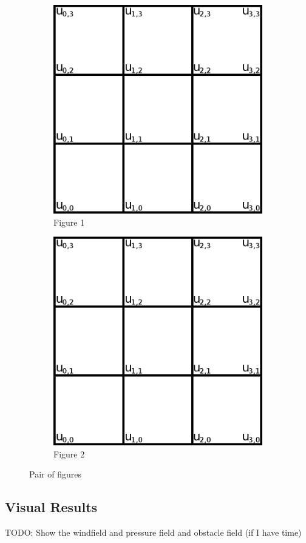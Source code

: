 \begin{figure}[ht]
	\center
	
	\begin{subfigure}{0.45\textwidth}
		\center
		\includegraphics[width=1.0\textwidth]{images/2d_poisson_ex}
		\caption{Figure 1}
		\label{fig:1}
	\end{subfigure}
	\begin{subfigure}{0.45\textwidth}
		\center
		\includegraphics[width=1.0\textwidth]{images/2d_poisson_ex}
		\caption{Figure 2}
		\label{fig:2}
	\end{subfigure}
	\caption{Pair of figures}
	\label{fig:double}
	
\end{figure}

\subsection{Visual Results}

TODO: Show the windfield and pressure field and obstacle field (if I have time)
